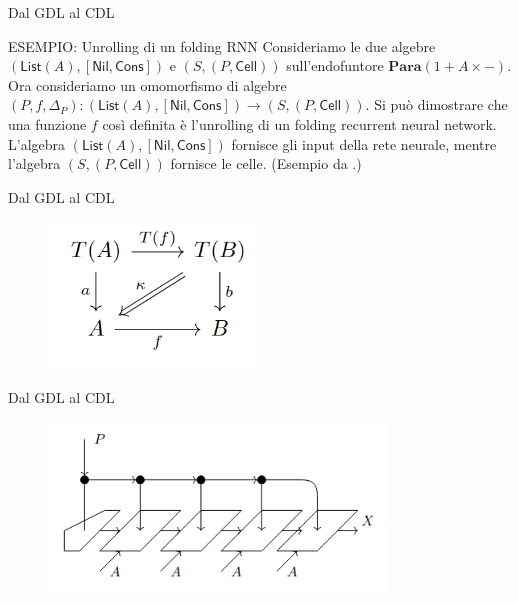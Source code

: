 \documentclass{beamer}
\begin{document}
\begin{frame}{Dal GDL al CDL}
    \begin{block}{ESEMPIO: Unrolling di un folding RNN}
        Consideriamo le due algebre $(\mathsf{List}(A), [\mathsf{Nil}, \mathsf{Cons}])$ e $(S,(P,\mathsf{Cell}))$ sull'endofuntore $\mathbf{Para}(1 + A \times -)$.
        Ora consideriamo un omomorfismo di algebre $(P,f,\Delta_P): (\mathsf{List}(A), [\mathsf{Nil}, \mathsf{Cons}]) \to (S,(P,\mathsf{Cell}))$. Si può dimostrare che una funzione $f$ così definita è l'unrolling di un folding recurrent neural network. L'algebra $(\mathsf{List}(A), [\mathsf{Nil}, \mathsf{Cons}])$ fornisce gli input della rete neurale, mentre l'algebra $(S,(P,\mathsf{Cell}))$ fornisce le celle. (Esempio da \cite{gavranovicposition}.)
    \end{block}
\end{frame}

\begin{frame}{Dal GDL al CDL}
    \begin{figure}
        \begin{center}
            \includegraphics[width=0.5\textwidth]{figures/lax_algebra_hom.png}
            \caption*{\cite{gavranovicposition}}
        \end{center}
    \end{figure}
\end{frame}

\begin{frame}{Dal GDL al CDL}
    \begin{figure}
        \begin{center}
            \includegraphics[width=0.8\textwidth]{figures/folding_rnn.png}
            \caption*{\cite{gavranovicposition}}
        \end{center}
    \end{figure}
\end{frame}
\end{document}
